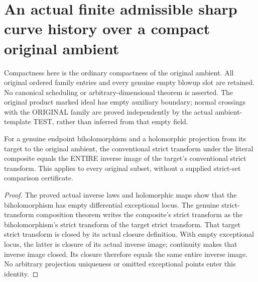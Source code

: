 \section{An actual finite admissible sharp curve history over a compact original ambient}

Compactness here is the ordinary compactness of the original ambient.
All original ordered family entries and every genuine empty blowup slot
are retained. No canonical scheduling or arbitrary-dimensional theorem is
asserted. The original product marked ideal has empty auxiliary boundary;
normal crossings with the ORIGINAL family are proved independently by the
actual ambient-template TEST, rather than inferred from that empty field.

\begin{lemma}
\label{hir:sharp-actual-curve-finite-endpoint-biholomorphic-strict-identity}
\leanok
For a genuine endpoint biholomorphism and a holomorphic projection from its
target to the original ambient, the conventional strict transform under
the literal composite equals the ENTIRE inverse image of the target's
conventional strict transform. This applies to every original subset,
without a supplied strict-set comparison certificate.
\end{lemma}
\begin{proof}
The proved actual inverse laws and holomorphic maps show that the
biholomorphism has empty differential exceptional locus. The genuine
strict-transform composition theorem writes the composite's strict
transform as the biholomorphism's strict transform of the target strict
transform. That target strict transform is closed by its actual closure
definition. With empty exceptional locus, the latter is closure of its
actual inverse image; continuity makes that inverse image closed. Its
closure therefore equals the same entire inverse image. No arbitrary
projection uniqueness or omitted exceptional points enter this identity.
\end{proof}

